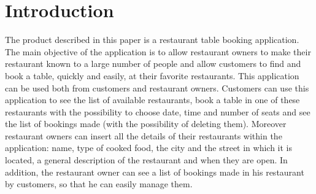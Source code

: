 \chapter{Introduction}
The product described in this paper is a restaurant table booking application. The main objective of the application is to allow restaurant owners to make their restaurant known to a large number of people and allow customers to find and book a table, quickly and easily, at their favorite restaurants.\newline
This application can be used both from customers and restaurant owners. Customers can use this application to see the list of available restaurants, book a table in one of these restaurants with the possibility to choose date, time and number of seats and see the list of bookings made (with the possibility of deleting them).\newline
Moreover restaurant owners can insert all the details of their restaurants within the application: name, type of cooked food, the city and the street in which it is located, a general description of the restaurant and when they are open.
In addition, the restaurant owner can see a list of bookings made in his restaurant by customers, so that he can easily manage them.